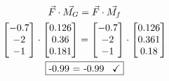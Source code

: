 \begin{gather}
\vec{F} \cdot \vec{M_G} = \vec{F} \cdot \vec{M_f} \\
\begin{bmatrix} -0.7 \\ -2 \\ -1 \end{bmatrix} \cdot \begin{bmatrix} 0.126 \\ 0.36 \\ 0.181 \end{bmatrix} = \begin{bmatrix} -0.7 \\ -2 \\ -1 \end{bmatrix} \cdot  \begin{bmatrix} 0.126 \\ 0.361 \\ 0.18 \end{bmatrix} \\
\fbox{-0.99 = -0.99 \, \checkmark}
\end{gather}
